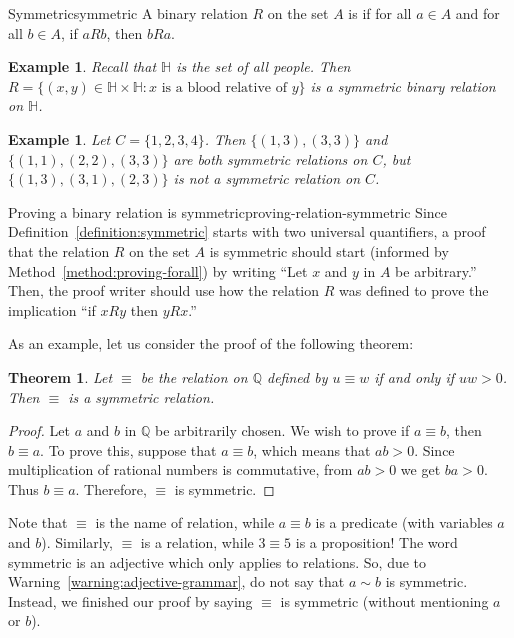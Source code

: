 \documentclass{book}
\newcounter{ekcounter}%
\theoremstyle{ekimcustom}
\newtheorem{theorem}[ekcounter]{Theorem}
\newtheorem{example}[ekcounter]{Example}
\newcommand\defn[1]{{\color{blue}{\bf #1}}}
\begin{document}
\begin{bdefinition}{Symmetric}{symmetric}
A binary relation $R$ on the set $A$ is \defn{symmetric} if for all $a \in A$ and for all $b \in A$, if $aRb$, then $bRa$.
\end{bdefinition}
\begin{example}
Recall that $\mathbb{H}$ is the set of all people. Then $R = \{(x,y) \in \mathbb{H} \times \mathbb{H} : x \text{ is a blood relative of } y\}$ is a symmetric binary relation on $\mathbb{H}$.
\end{example}
\begin{example}
Let $C = \{1,2,3,4\}$. Then $\{(1,3),(3,3)\}$ and $\{(1,1),(2,2),(3,3)\}$ are both symmetric relations on $C$, but $\{(1,3),(3,1),(2,3)\}$ is not a symmetric relation on $C$.
\end{example}

\begin{bmethod}{Proving a binary relation is symmetric}{proving-relation-symmetric}
Since Definition~\ref{definition:symmetric} starts with two universal quantifiers, a proof that the relation $R$ on the set $A$ is symmetric should start (informed by Method~\ref{method:proving-forall}) by writing ``Let $x$ and $y$ in $A$ be arbitrary.'' Then, the proof writer should use how the relation $R$ was defined to prove the implication ``if $xRy$ then $yRx$.''
\end{bmethod}
As an example, let us consider the proof of the following theorem:
\begin{theorem}
Let $\equiv$ be the relation on $\mathbb{Q}$ defined by $u \equiv w$ if and only if $uw > 0$. Then $\equiv$ is a symmetric relation.
\end{theorem}
\begin{proof}
Let $a$ and $b$ in $\mathbb{Q}$ be arbitrarily chosen. We wish to prove if $a \equiv b$, then $b \equiv a$. To prove this, suppose that $a \equiv b$, which means that $ab > 0$. Since multiplication of rational numbers is commutative, from $ab>0$ we get $ba>0$. Thus $b \equiv a$. Therefore, $\equiv$ is symmetric.
\end{proof}
\begin{bwarning}{}{}
Note that $\equiv$ is the name of relation, while $a \equiv b$ is a predicate (with variables $a$ and $b$). Similarly, $\equiv$ is a relation, while $3 \equiv 5$ is a proposition! The word symmetric is an adjective which only applies to relations. So, due to Warning~\ref{warning:adjective-grammar}, do not say that $a \sim b$ is symmetric. Instead, we finished our proof by saying $\equiv$ is symmetric (without mentioning $a$ or $b$).\end{bwarning}
\end{document}
